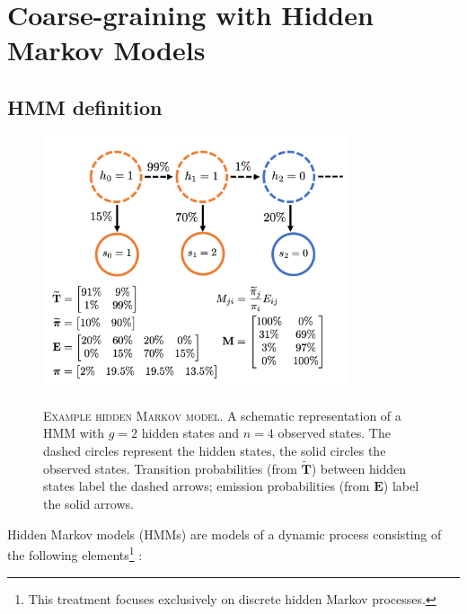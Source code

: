 \section{Coarse-graining with Hidden Markov Models}\label{sec:theory_hmm}
\subsection{HMM definition}
\begin{figure}
    \centering
    \caption[Example hidden Markov model]{\textsc{Example hidden Markov model}. A schematic representation of a HMM with $g=2$ hidden states and $n=4$ observed states. The dashed circles represent the hidden states, the solid circles the observed states. Transition probabilities (from $\widetilde{\mathbf{T}}$) between hidden states label the dashed arrows; emission probabilities (from $\mathbf{E}$) label the solid arrows. }
    \includegraphics[width=0.8\textwidth]{chapters/theory/figures/hmm.png}
    \label{fig:theory_hmm}
\end{figure}
Hidden Markov models (HMMs) are models of a dynamic process consisting of the following elements\footnote{This treatment focuses exclusively on discrete hidden Markov processes.} \cite{rabinerTutorialHiddenMarkov1989}:
